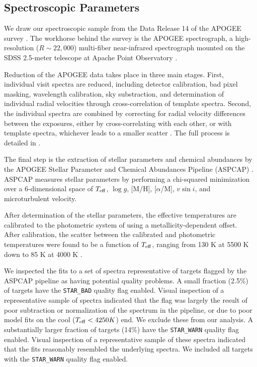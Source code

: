 \documentclass[manuscript]{aastex6}
\newcommand{\vsini}{\ensuremath{v \sin i}}
\newcommand{\Teff}{\ensuremath{T_{\rm eff}}}
\newcommand{\logg}{\ensuremath{\log g}}
\newcommand{\STARBAD}{\texttt{STAR\_BAD}}
\newcommand{\STARWARN}{\texttt{STAR\_WARN}}
\begin{document}
\subsection{Spectroscopic Parameters}

We draw our spectroscopic sample from the Data Release 14 \citep{Abolfathi18}
of the APOGEE survey \citep{Majewski17}. The workhorse behind the survey is the
APOGEE spectrograph, a high-resolution (\(R \sim 22,000\)) multi-fiber
near-infrared spectrograph \citep{Wilson10} mounted on the SDSS 2.5-meter
telescope at Apache Point Observatory \citep{Gunn06}.

Reduction of the APOGEE data takes place in three main stages. First,
individual visit spectra are reduced, including detector calibration, bad pixel
masking, wavelength calibration, sky substraction, and determination of
individual radial velocities through cross-correlation of template spectra.
Second, the individual spectra are combined by correcting for radial velocity
differences between the exposures, either by cross-correlating with each other,
or with template spectra, whichever leads to a smaller scatter
\citep{Holtzman18}. The full process is detailed in \citet{Nidever15}.

The final step is the extraction of stellar parameters and chemical abundances
by the APOGEE Stellar Parameter and Chemical Abundances Pipeline (ASPCAP)
\citep{GarciaPerez16}. ASPCAP measures stellar parameters by performing a
chi-squared minimization \citep{AllendePrieto06} over a 6-dimensional space of
\Teff, \logg, [M/H], [\(\alpha\)/M], \vsini, and microturbulent velocity.

After determination of the stellar parameters, the effective temperatures are 
calibrated to the photometric system of \citet{GonzalezHernandez09} using a 
metallicity-dependent offset. After calibration, the scatter between the 
calibrated and photometric temperatures  were found to be a function of 
\Teff{}, ranging from 130 K at 5500 K down to 85 K at 4000 K
\citep{Holtzman18}.

We inspected the fits to a set of spectra representative of targets flagged 
by the ASPCAP pipeline as having potential quality problems. A small fraction
(2.5\%) of targets have the \STARBAD{} quality flag enabled. Visual inspection
of a representative sample of spectra indicated that the flag was largely the
result of poor subtraction or normalization of the spectrum in the pipeline, or
due to poor model fits on the cool (\(\Teff < 4250 K\)) end. We exclude these
from our analysis. A substantially larger fraction of targets (14\%) have the 
\STARWARN{} quality flag enabled. Visual inspection of a representative sample 
of these spectra indicated that the fits reasonably resembled the underlying 
spectra. We included all targets with the \STARWARN{} quality flag enabled.
\end{document}

